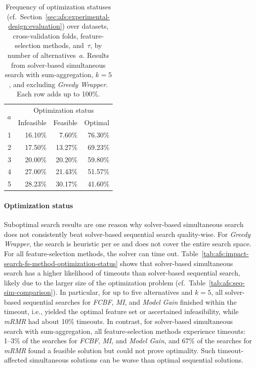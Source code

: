 \documentclass{article}
\theoremstyle{definition}
\begin{document}
\begin{table}[t]
	\centering
	\caption{
		Frequency of optimization statuses (cf.~Section~\ref{sec:afs:experimental-design:evaluation}) over datasets, cross-validation folds, feature-selection methods, and~$\tau$, by number of alternatives~$a$.
		Results from solver-based simultaneous search with sum-aggregation, $k=5$, and excluding \emph{Greedy Wrapper}.
		Each row adds up to 100\%.
	}
	\begin{tabular}{rrrr}
		\toprule
		\multirow{2}{*}{$a$} & \multicolumn{3}{c}{Optimization status} \\
		\cmidrule(lr){2-4}
		& Infeasible & Feasible & Optimal \\
		\midrule
		1 & 16.10\% & 7.60\% & 76.30\% \\
		2 & 17.50\% & 13.27\% & 69.23\% \\
		3 & 20.00\% & 20.20\% & 59.80\% \\
		4 & 27.00\% & 21.43\% & 51.57\% \\
		5 & 28.23\% & 30.17\% & 41.60\% \\
		\bottomrule
	\end{tabular}
	\label{tab:afs:impact-num-alternatives-optimization-status}
\end{table}

\paragraph{Optimization status}

Suboptimal search results are one reason why solver-based simultaneous search does not consistently beat solver-based sequential search quality-wise.
For \emph{Greedy Wrapper}, the search is heuristic per se and does not cover the entire search space.
For all feature-selection methods, the solver can time out.
Table~\ref{tab:afs:impact-search-fs-method-optimization-status} shows that solver-based simultaneous search has a higher likelihood of timeouts than solver-based sequential search, likely due to the larger size of the optimization problem (cf.~Table~\ref{tab:afs:seq-sim-comparison}).
In particular, for up to five alternatives and $k=5$, all solver-based sequential searches for \emph{FCBF}, \emph{MI}, and \emph{Model Gain} finished within the timeout, i.e., yielded the optimal feature set or ascertained infeasibility, while \emph{mRMR} had about 10\% timeouts.
In contrast, for solver-based simultaneous search with sum-aggregation, all feature-selection methods experience timeouts:
1--3\% of the searches for \emph{FCBF}, \emph{MI}, and \emph{Model Gain}, and 67\% of the searches for \emph{mRMR} found a feasible solution but could not prove optimality.
Such timeout-affected simultaneous solutions can be worse than optimal sequential solutions.
\end{document}
